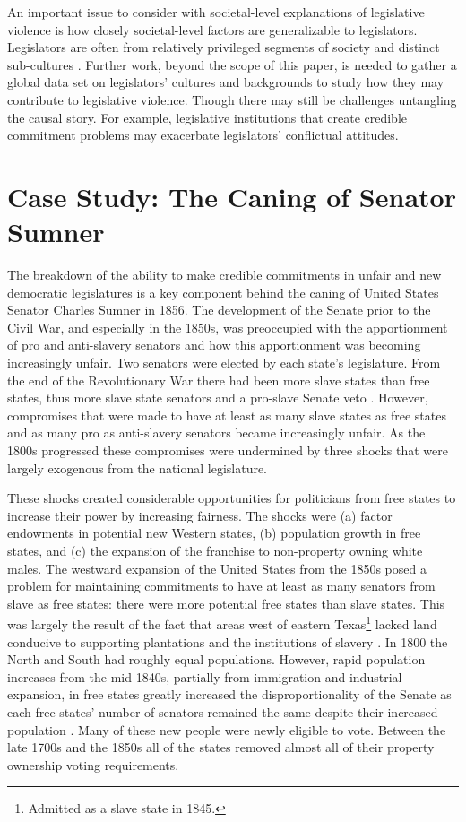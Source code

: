 \documentclass[a4paper]{article}\usepackage[]{graphicx}\usepackage[]{color}
\begin{document}
An important issue to consider with societal-level explanations of legislative violence is how closely societal-level factors are generalizable to legislators. Legislators are often from relatively privileged segments of society and distinct sub-cultures \citep[408]{Spary2013}. Further work, beyond the scope of this paper, is needed to gather a global data set on legislators' cultures and backgrounds to study how they may contribute to legislative violence. Though there may still be challenges untangling the causal story. For example, legislative institutions that create credible commitment problems may exacerbate legislators' conflictual attitudes.

\section{Case Study: The Caning of Senator Sumner}

The breakdown of the ability to make credible commitments in unfair and new democratic legislatures is a key component behind the caning of United States Senator Charles Sumner in 1856. The development of the Senate prior to the Civil War, and especially in the 1850s, was preoccupied with the apportionment of pro and anti-slavery senators and how this apportionment was becoming increasingly unfair. Two senators were elected by each state's legislature. From the end of the Revolutionary War there had been more slave states than free states, thus more slave state senators and a pro-slave Senate veto \cite[see][151]{Weingast1998}. However, compromises that were made to have at least as many slave states as free states and as many pro as anti-slavery senators became increasingly unfair. As the 1800s progressed these compromises were undermined by three shocks that were largely exogenous from the national legislature.

These shocks created considerable opportunities for politicians from free states to increase their power by increasing fairness. The shocks were (a) factor endowments in potential new Western states, (b) population growth in free states, and (c) the expansion of the franchise to non-property owning white males.  The westward expansion of the United States from the 1850s posed a problem for maintaining commitments to have at least as many senators from slave as free states: there were more potential free states than slave states. This was largely the result of the fact that areas west of eastern Texas\footnote{Admitted as a slave state in 1845.} lacked land conducive to supporting plantations and the institutions of slavery \cite[see][]{Ramsdell1929,Weingast1998}. In 1800 the North and South had roughly equal populations. However, rapid population increases from the mid-1840s, partially from immigration and industrial expansion, in free states greatly increased the disproportionality of the Senate as each free states' number of senators remained the same despite their increased population \cite[see][184]{Weingast1998}. Many of these new people were newly eligible to vote. Between the late 1700s and the 1850s all of the states removed almost all of their property ownership voting requirements.
\end{document}
